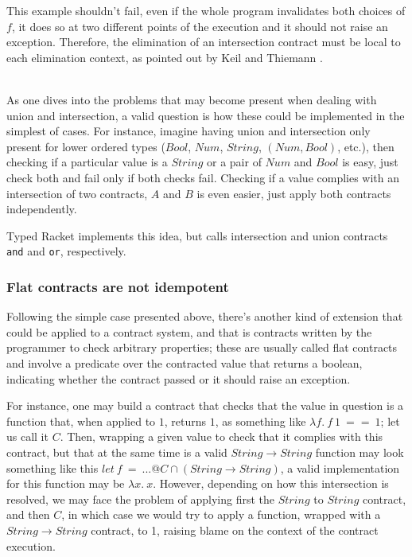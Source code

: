 This example shouldn't fail, even if the whole program invalidates both choices of $f$, it does
so at two different points of the execution and it should not raise an exception.
Therefore, the elimination of an intersection contract must be local to each elimination
context, as pointed out by Keil and Thiemann \cite{KeilThiemannUnionIntersection}.

\\


As one dives into the problems that may become present when dealing with union and intersection,
a valid question is how these could be implemented in the simplest of cases.
For instance, imagine having
union and intersection only present for lower ordered types 
($Bool$, $Num$, $String$, $(Num, Bool)$, etc.), then checking
if a particular value is a $String$ or a pair of $Num$ and $Bool$ is easy,
just check both and fail only if both checks fail.
Checking if a value complies with an intersection of two contracts, $A$ and $B$ is even
easier, just apply both contracts independently.

Typed Racket implements this idea, but calls intersection and union contracts
\texttt{and} and \texttt{or}, respectively.


\subsubsection*{Flat contracts are not idempotent}

Following the simple case presented above, there's another kind of extension that could be
applied to a contract system, and that is contracts written by the
programmer to check arbitrary properties; these are usually called flat contracts and
involve a predicate over the contracted value that returns a boolean, indicating whether
the contract passed or it should raise an exception.

For instance, one may build a contract that checks that the value in question is a
function that, when applied to $1$, returns $1$, as something like
$\lambda f.~f~1~==~1$; let us call it $C$.
Then, wrapping a given value to check that it complies with this contract, but that at
the same time is a valid $String \rightarrow String$ function may look something like this
$let~f~=~...@C \cap (String \rightarrow String)$, a valid implementation for this function
may be $\lambda x.~x$.
However, depending on how this intersection is resolved, we may face the problem of applying first
the $String$ to $String$ contract, and then $C$, in which case we would try to apply a function,
wrapped with a $String \rightarrow String$ contract, to 1, raising blame on the context
of the contract execution.

